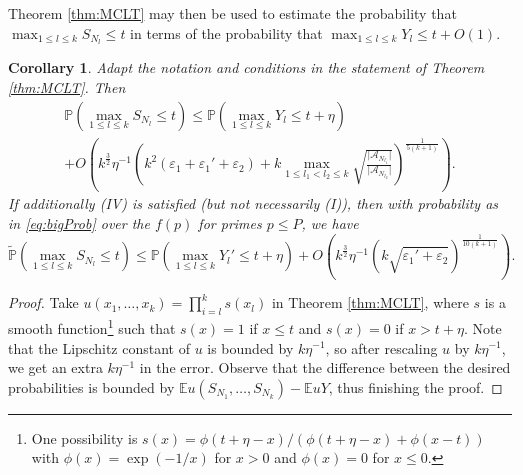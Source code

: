 \documentclass[11pt]{tran-l}
\newtheorem{cor}[theorem]{Corollary}
\theoremstyle{definition}
\theoremstyle{remark}
\numberwithin{equation}{section}
\begin{document}
Theorem \ref{thm:MCLT} may then be used to estimate the probability that $\max_{1\leq l\leq k} S_{N_l}\leq t$ in terms of the probability that $\max_{1\leq l\leq k} Y_{l}\leq t + O(1)$. 
\begin{cor}\label{cor:normalcomparison}
    Adapt the notation and conditions in the statement of Theorem \ref{thm:MCLT}. Then 
    \begin{multline*}
        \mathbb P\left(\max_{1\leq l\leq k} S_{N_l} \leq t\right)\leq \mathbb P\left(\max_{1\leq l\leq k} Y_l\leq t+\eta\right) \\ + O\left(k^{\frac{3}{2}}\eta^{-1} \left(  k^2(\varepsilon_1 + \varepsilon_1'  + \varepsilon_2) + k \max_{1\leq l_1<l_2\leq k} \sqrt{\frac{\lvert \mathcal A_{N_{l_1}}\rvert}{\lvert \mathcal A_{N_{l_2}}\rvert}} \right)^{\frac1{5(k+1)}}\right).
    \end{multline*}
    If additionally (IV) is satisfied (but not necessarily (I)), then with probability as in \eqref{eq:bigProb} over the $f(p)$ for primes $p\leq P$, we have 
    \begin{equation*}
        \widetilde{\mathbb P}\left(\max_{1\leq l\leq k} S_{N_l} \leq t\right)\leq \mathbb P\left(\max_{1\leq l\leq k} Y_l'\leq t+\eta\right)  + O\left(k^{\frac{3}{2}}\eta^{-1} \left(k\sqrt{\varepsilon_1' + \varepsilon_2}\right)^{\frac1{10(k+1)}}\right).
    \end{equation*}
    
\end{cor}

\begin{proof}
    Take $u(x_1, \ldots, x_k) = \prod_{i=l}^k s(x_l)$ in Theorem \ref{thm:MCLT}, where $s$ is a smooth function\footnote{One possibility is $s(x) = \phi(t+\eta - x)/(\phi(t+\eta - x) + \phi(x-t))$ with $\phi(x)=\exp(-1/x)$ for $x>0$ and $\phi(x)=0$ for $x\leq 0$.} such that $s(x) = 1$ if $x\leq t$ and $s(x) = 0$ if $x>t+\eta$. Note that the Lipschitz constant of $u$ is bounded by $k\eta^{-1}$, so after rescaling $u$ by $k\eta^{-1}$, we get an extra $k\eta^{-1}$ in the error. Observe that the difference between the desired probabilities is bounded by $\mathbb E u(S_{N_1}, \ldots, S_{N_k}) - \mathbb EuY$, thus finishing the proof.
\end{proof}
\end{document}
